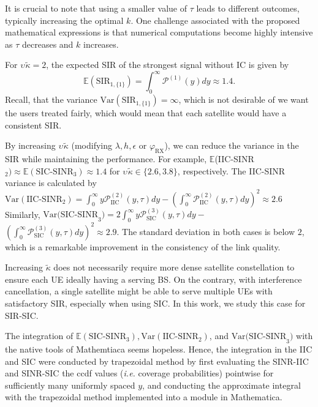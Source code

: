 \documentclass[lettersize,journal]{IEEEtran}
\begin{document}
It is crucial to note that using a smaller value of $\tau$ leads to different outcomes, typically increasing the optimal $k$. One challenge associated with the proposed mathematical expressions is that numerical computations become highly intensive as $\tau$ decreases and $k$ increases.


For $\upsilon_{} \tilde{\kappa}=2$, the expected SIR of the strongest signal without IC is given by
\begin{equation}
  \mathbb{E}(\text{SIR}_{1,\{1\}})= \int_{0}^{\infty}\mathcal{P}^{(1)}(y)dy \approx 1.4.
\end{equation}
 Recall, that the variance $\text{Var}(\text{SIR}_{1,\{1\}})=\infty$, which is not desirable of we want the users treated fairly, which would mean that each satellite would have a consistent SIR.

  By increasing $\upsilon_{} \tilde{\kappa}$ (modifying $\lambda,h,\epsilon$ or $\varphi_{\text{RX}}$), we can reduce the variance in the SIR while maintaining the performance. For example, $ \mathbb{E}$(IIC-SINR$_{2}) \approx \mathbb{E}(\text{SIC-SINR}_{3}) \approx 1.4$ for $\upsilon_{} \tilde{\kappa}\in \{2.6,3.8\}$, respectively. The IIC-SINR variance is calculated by
  $\text{Var}(\text{IIC-SINR}_{2})=\int_{0}^{\infty}y\mathcal{P}_{\text{IIC}}^{(2)}(y,\tau)dy -\left(\int_{0}^{\infty}\mathcal{P}_{\text{IIC}}^{(2)}(y,\tau)dy\right)^2  \approx 2.6$ Similarly, $\text{Var(SIC-SINR}_{3}) = 2\int_{0}^{\infty}y\mathcal{P}_{\text{SIC}}^{(3)}(y,\tau)dy-$ $\left(\int_{0}^{\infty}\mathcal{P}_{\text{SIC}}^{(3)}(y,\tau)dy\right)^2 \approx 2.9$. The standard deviation in both cases is below $2$, which is a remarkable improvement in the consistency of the link quality.



  Increasing $\tilde{\kappa}$ does not necessarily require more dense satellite constellation to ensure each UE ideally having a serving BS. On the contrary, with interference cancellation, a single satellite might be able to serve multiple UEs with satisfactory SIR, especially when using SIC. In this work, we study this case for SIR-SIC.



  The integration of $\mathbb{E}(\text{SIC-SINR}_{3}),\text{Var}(\text{IIC-SINR}_{2})$, and $\text{Var(SIC-SINR}_{3})$ with the native tools of Mathemtiaca seems hopeless. Hence, the integration in the IIC and SIC were conducted by trapezoidal method by first evaluating the SINR-IIC and SINR-SIC the ccdf values (\textit{i.e.} coverage probabilities) pointwise for sufficiently many uniformly spaced $y$, and conducting the approximate integral with the trapezoidal method implemented into a module in Mathematica.  
\end{document}
